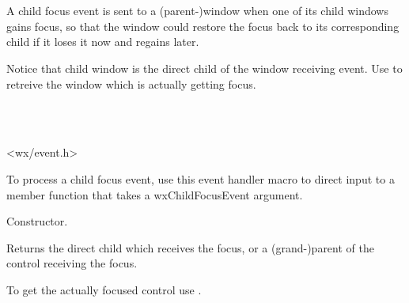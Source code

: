 \section{}\label{wxchildfocusevent}

A child focus event is sent to a (parent-)window when one of its child windows gains focus,
so that the window could restore the focus back to its corresponding child
if it loses it now and regains later.

Notice that child window is the direct child of the window receiving event.
Use  to retreive the window which is actually getting focus. 


\\
\\


<wx/event.h>


To process a child focus event, use this event handler macro to direct input to a member
function that takes a wxChildFocusEvent argument.

\twocolwidtha{7cm}
\begin{twocollist}\itemsep=0pt
\end{twocollist}%





\label{wxchildfocuseventctor}


Constructor.




\label{wxchildfocuseventgetwindow}

Returns the direct child which receives the focus, or a (grand-)parent of the control receiving the focus.

To get the actually focused control use .

